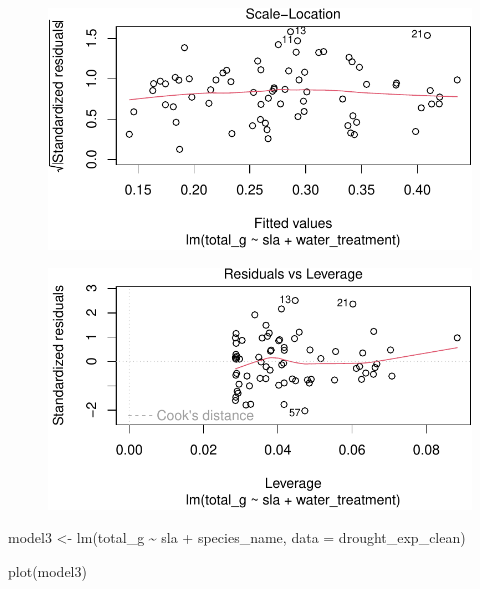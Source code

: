 \documentclass[
  letterpaper,
  DIV=11,
  numbers=noendperiod]{scrartcl}
\newenvironment{Shaded}{\begin{snugshade}}{\end{snugshade}}
\newcommand{\AttributeTok}[1]{\textcolor[rgb]{0.40,0.45,0.13}{#1}}
\newcommand{\FunctionTok}[1]{\textcolor[rgb]{0.28,0.35,0.67}{#1}}
\newcommand{\NormalTok}[1]{\textcolor[rgb]{0.00,0.23,0.31}{#1}}
\newcommand{\OtherTok}[1]{\textcolor[rgb]{0.00,0.23,0.31}{#1}}
\newcommand{\SpecialCharTok}[1]{\textcolor[rgb]{0.37,0.37,0.37}{#1}}
\begin{document}
\begin{figure}[H]

{\centering \includegraphics{Odile_Gabbiani_homework-03_files/figure-pdf/unnamed-chunk-9-3.pdf}

}

\end{figure}

\begin{figure}[H]

{\centering \includegraphics{Odile_Gabbiani_homework-03_files/figure-pdf/unnamed-chunk-9-4.pdf}

}

\end{figure}

\begin{Shaded}
\begin{Highlighting}[]
\NormalTok{model3 }\OtherTok{\textless{}{-}} \FunctionTok{lm}\NormalTok{(total\_g }\SpecialCharTok{\textasciitilde{}}\NormalTok{ sla }\SpecialCharTok{+}\NormalTok{ species\_name,}
             \AttributeTok{data =}\NormalTok{ drought\_exp\_clean)}

\FunctionTok{plot}\NormalTok{(model3)}
\end{Highlighting}
\end{Shaded}
\end{document}
